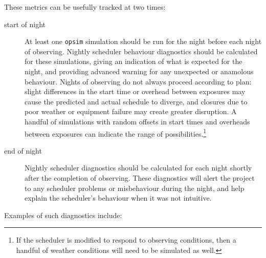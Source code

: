 These metrics can be usefully tracked at two times:
\begin{description}
\item[{start of night}] At least one \texttt{opsim} simulation should be run for the night before each night of observing. Nightly scheduler behaviour diagnostics should be calculated for these simulations, giving an indication of what is expected for the night, and providing advanced warning for any unexpected or anamolous behaviour. Nights of observing do not always proceed according to plan: slight differences in the start time or overhead between exposures may cause the predicted and actual schedule to diverge, and closures due to poor weather or equipment failure may create greater disruption. A handful of simulations with random offsets in start times and overheads between exposures can indicate the range of possibilities.\footnote{If the scheduler is modified to respond to observing conditions, then a handful of weather conditions will need to be simulated as well.}
\item[{end of night}] Nightly scheduler diagnostics should be calculated for each night shortly after the completion of observing. These diagnostics will alert the project to any scheduler problems or misbehaviour during the night, and help explain the scheduler's behaviour when it was not intuitive.
\end{description}

Examples of such diagnostics include:

